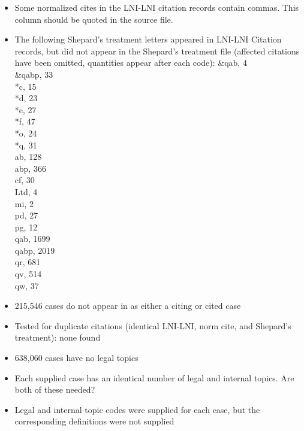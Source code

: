 \documentclass[10pt, letterpaper]{article}
\begin{document}
\begin{spacing}{1.0}
\begin{itemize}
    \item {\color{red}Some normalized cites in the LNI-LNI citation records contain commas.  This column should be quoted in the source file.}
    \item {\color{red}The following Shepard's treatment letters appeared in LNI-LNI Citation records, but did not appear in the Shepard's treatment file} (affected citations have been omitted, quantities appear after each code):
    \&qab, 4\\
    \&qabp, 33\\
    *c, 15\\
    *d, 23\\
    *e, 27\\
    *f, 47\\
    *o, 24\\
    *q, 31\\
    ab, 128\\
    abp, 366\\
    cf, 30\\
    Ltd, 4\\
    mi, 2\\
    pd, 27\\
    pg, 12\\
    qab, 1699\\
    qabp, 2019\\
    qr, 681\\
    qv, 514\\
    qw, 37\\
    
    \item 215,546 cases do not appear in as either a citing or cited case
    
    \item Tested for duplicate citations (identical LNI-LNI, norm cite, and Shepard's treatment):  none found
    
    \item 638,060 cases have no legal topics
    
    \item {\color{red}Each supplied case has an identical number of legal and internal topics.  Are both of these needed?}
    
    \item {\color{red}Legal and internal topic codes were supplied for each case, but the corresponding definitions were not supplied}
    
\end{itemize}

\clearpage


\end{spacing}
\end{document}

